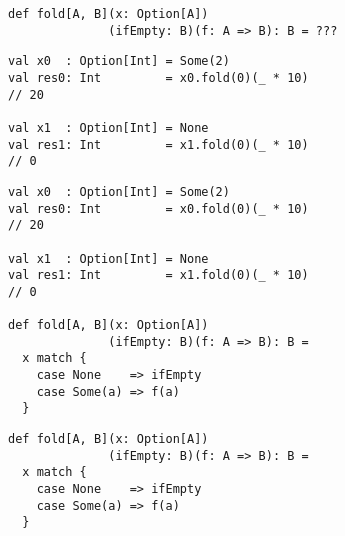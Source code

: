 \documentclass[include/preamble.tex]{subfiles}
\begin{document}
\begin{frame}[fragile]
  \begin{center}
    \begin{lstlisting}[style=scala]
def fold[A, B](x: Option[A])
              (ifEmpty: B)(f: A => B): B = ???
    \end{lstlisting}
    \pause
    \vspace{1em}
    \begin{lstlisting}[style=scala]
val x0  : Option[Int] = Some(2)
val res0: Int         = x0.fold(0)(_ * 10)
// 20

val x1  : Option[Int] = None
val res1: Int         = x1.fold(0)(_ * 10)
// 0
    \end{lstlisting}
  \end{center}
\end{frame}

\begin{frame}[fragile]
  \begin{center}
    \begin{lstlisting}[style=scala]
val x0  : Option[Int] = Some(2)
val res0: Int         = x0.fold(0)(_ * 10)
// 20

val x1  : Option[Int] = None
val res1: Int         = x1.fold(0)(_ * 10)
// 0

def fold[A, B](x: Option[A])
              (ifEmpty: B)(f: A => B): B =
  x match {
    case None    => ifEmpty
    case Some(a) => f(a)
  }
    \end{lstlisting}
  \end{center}
\end{frame}

\begin{frame}[fragile]
  \begin{center}
    \begin{lstlisting}[style=scala]
def fold[A, B](x: Option[A])
              (ifEmpty: B)(f: A => B): B =
  x match {
    case None    => ifEmpty
    case Some(a) => f(a)
  }
    \end{lstlisting}
  \end{center}
\end{frame}
\end{document}
